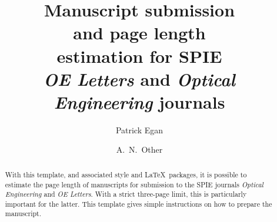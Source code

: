 \documentclass[10pt,letterpaper,optenglett,fleqn]{article}      %
\begin{document}

\title{Manuscript submission \\ and page length \\ estimation for
SPIE\\ \emph{OE Letters} and \emph{Optical \\ Engineering} journals}


\author{Patrick Egan}

\address{University of Limerick\\ Castletroy\\ County Limerick\\ Ireland}


\author{A.~N.~Other\SPIEmember}

\address{Research Group \\ Affiliation\\ Address}







\begin{abstract}
%
With this template, and associated style and \LaTeX\ packages, it is
possible to estimate the page length of manuscripts for submission
to the SPIE journals \emph{Optical Engineering} and \emph{OE
Letters}. With a strict three-page limit, this is particularly
important for the latter. This template gives simple instructions on
how to prepare the manuscript.
%
\end{abstract}





\end{document}
